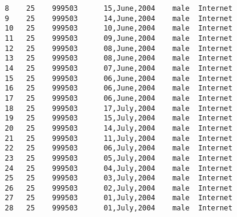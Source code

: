 \documentclass[11pt]{article}
\begin{document}
\begin{Verbatim}[commandchars=\\\{\}]
8    25    999503      15,June,2004    male  Internet   
9    25    999503      14,June,2004    male  Internet   
10   25    999503      10,June,2004    male  Internet   
11   25    999503      09,June,2004    male  Internet   
12   25    999503      08,June,2004    male  Internet   
13   25    999503      08,June,2004    male  Internet   
14   25    999503      07,June,2004    male  Internet   
15   25    999503      06,June,2004    male  Internet   
16   25    999503      06,June,2004    male  Internet   
17   25    999503      06,June,2004    male  Internet   
18   25    999503      17,July,2004    male  Internet   
19   25    999503      15,July,2004    male  Internet   
20   25    999503      14,July,2004    male  Internet   
21   25    999503      11,July,2004    male  Internet   
22   25    999503      06,July,2004    male  Internet   
23   25    999503      05,July,2004    male  Internet   
24   25    999503      04,July,2004    male  Internet   
25   25    999503      03,July,2004    male  Internet   
26   25    999503      02,July,2004    male  Internet   
27   25    999503      01,July,2004    male  Internet   
28   25    999503      01,July,2004    male  Internet   


\end{Verbatim}
\end{document}
